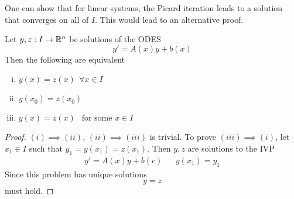 \documentclass[../../script.tex]{subfiles}
\begin{document}
\begin{rem}
    One can show that for linear systems, the Picard iteration leads to a solution that converges on all of $I$. This would lead to an alternative proof.
\end{rem}

\begin{cor}
    Let $y, z: I \rightarrow \mathbb{R}^n$ be solutions of the ODES 
    \[
        y' = A(x)y + b(x)
    \]
    Then the following are equivalent 
    \begin{enumerate}[(i)]
        \item $y(x) = z(x) ~~\forall x \in I$
        \item $y(x_0) = z(x_0)$
        \item $y(x) = z(x) ~~\text{ for some } x \in I$
    \end{enumerate}
\end{cor}
\begin{proof}
    $(i) \implies (ii)$, $(ii) \implies (iii)$ is trivial. 
    To prove $(iii) \implies (i)$, let $x_1 \in I$ such that $y_1 = y(x_1) = z(x_1)$.
    Then $y, z$ are solutions to the IVP 
    \begin{align}
        y' = A(x)y + b(c) && y(x_1) = y_1
    \end{align}
    Since this problem has unique solutions
    \begin{equation}
        y = z
    \end{equation}
    must hold.
\end{proof}
\end{document}
